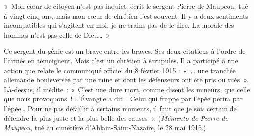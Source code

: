 \documentclass[french,twoside]{book} %
\begin{document}
« Mon cœur de citoyen n’est pas inquiet, écrit le sergent Pierre de Maupeou, tué à vingt-cinq ans, mais mon cœur de chrétien l’est souvent. Il y a deux sentiments incompatibles qui s’agitent en moi, je ne crains pas de le dire. La morale des hommes n’est pas celle de Dieu… »‌\par
Ce sergent du génie est un brave entre les braves. Ses deux citations à l’ordre de l’armée en témoignent. Mais c’est un chrétien à scrupules. Il a participé à une action que relate le communiqué officiel du 8 février 1915 : « … une tranchée allemande bouleversée par une mine et dont les défenseurs ont été pris ou tués ». Là-dessus, il médite : « C’est une dure mort, comme disent les mineurs, que celle que nous provoquons ! L’Évangile a dit : Celui qui frappe par l’épée périra par l’épée… Pour ne pas défaillir à certains moments, il faut que je sois certain de défendre la plus juste et la plus belle des causes ». ({\itshape Mémento de Pierre de Maupeou}, tué au cimetière d’Ablain-Saint-Nazaire, le 28 mai 1915.)‌\par
\end{document}
